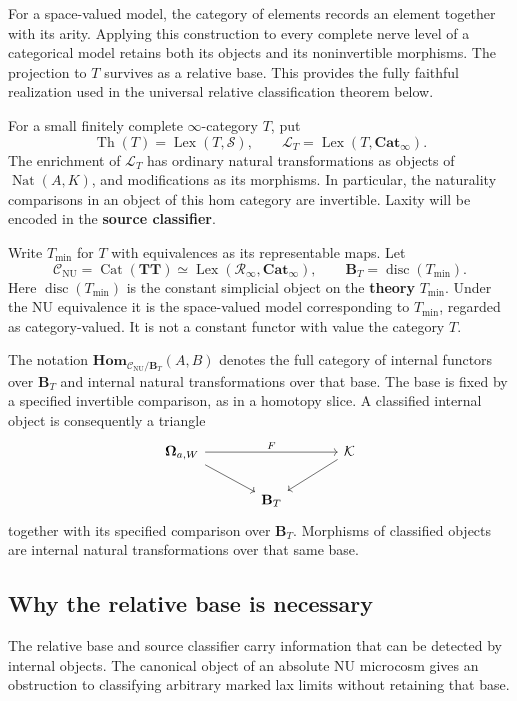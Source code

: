 \documentclass[oneside]{article}
\theoremstyle{plain}
\theoremstyle{definition}
\theoremstyle{remark}
\newcommand{\B}{\mathbf B}
\newcommand{\CNU}{\mathcal C_{\mathrm{NU}}}
\newcommand{\Cat}{\mathbf{Cat}_{\infty}}
\newcommand{\Homc}{\mathbf{Hom}}
\newcommand{\LT}{\mathcal L_T}
\newcommand{\Lex}{\operatorname{Lex}}
\newcommand{\Nat}{\operatorname{Nat}}
\newcommand{\Om}{\boldsymbol\Omega}
\newcommand{\RNU}{\mathcal R_{\infty}}
\newcommand{\Sps}{\mathcal S}
\newcommand{\TT}{\mathbf{TT}}
\newcommand{\Th}{\operatorname{Th}}
\newcommand{\cK}{\mathcal K}
\newcommand{\disc}{\operatorname{disc}}
\newcommand{\minrep}{\mathrm{min}}
\begin{document}
For a space-valued model, the category of elements records an element
together with its arity. Applying this construction to every complete
nerve level of a categorical model retains both its objects and its
noninvertible morphisms. The projection to $T$ survives as a relative
base. This provides the fully faithful realization used in the universal
relative classification theorem below.

For a small finitely complete $\infty$-category $T$, put
\[
 \Th(T)=\Lex(T,\Sps),\qquad \LT=\Lex(T,\Cat).
\]
The enrichment of $\LT$ has ordinary natural transformations as objects of $\Nat(A,K)$, and modifications as its morphisms. In particular, the naturality comparisons in an object of this hom category are invertible. Laxity will be encoded in the \textbf{source classifier}.

Write $T_{\minrep}$ for $T$ with equivalences as its representable maps. Let
\[
 \CNU=\operatorname{Cat}(\TT)\simeq\Lex(\RNU,\Cat),
 \qquad \B_T=\disc(T_{\minrep}).
\]
Here $\disc(T_{\minrep})$ is the constant simplicial object on the \textbf{theory} $T_{\minrep}$. Under the NU equivalence it is the space-valued model corresponding to $T_{\minrep}$, regarded as category-valued. It is not a constant functor with value the category $T$.

The notation $\Homc_{\CNU/\B_T}(A,B)$ denotes the full category of internal functors over $\B_T$ and internal natural transformations over that base. The base is fixed by a specified invertible comparison, as in a homotopy slice.
A classified internal object is consequently a triangle
\[
\begin{tikzcd}[column sep=large]
 \Om_{a,W}\ar[rr,"F"]\ar[dr]&&\cK\ar[dl]\\
 &\B_T&
\end{tikzcd}
\]
together with its specified comparison over $\B_T$. Morphisms of
classified objects are internal natural transformations over that same
base.


\subsection{Why the relative base is necessary}

The relative base and source classifier carry information that can
be detected by internal objects. The canonical object of an absolute
NU microcosm gives an obstruction to classifying arbitrary marked
lax limits without retaining that base.
\end{document}
